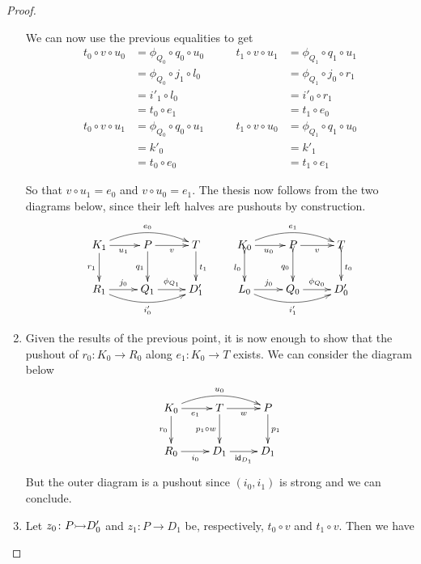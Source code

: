 \begin{proof}
\begin{enumerate}
		We can now use the previous equalities to get
		\[\begin{split}
			t_0\circ v\circ u_0&=\phi_{Q_0} \circ q_0\circ u_0\\&=\phi_{Q_0}\circ j_1\circ l_0\\&=i'_1\circ l_0\\&=t_0\circ e_1\\	t_0\circ v\circ u_1&=\phi_{Q_0} \circ q_0\circ u_1\\&=k'_0\\&= t_0\circ e_0
		\end{split} \qquad \begin{split}
			t_1\circ v\circ u_1&=\phi_{Q_1} \circ q_1\circ u_1\\&=\phi_{Q_1}\circ j_0\circ r_1\\&=i'_0\circ r_1\\&= t_1\circ e_0 \\ t_1\circ v\circ u_0&=\phi_{Q_1} \circ q_1\circ u_0\\&=k'_1\\&=t_1\circ e_1
		\end{split}\]
		
	So that $v\circ u_1=e_0$ and $v\circ u_0=e_1$. The thesis now follows from the two diagrams below, since their left halves are pushouts by construction.		
		\[\xymatrix{K_1  \ar@/^.4cm/[rr]^{e_0}\ar[r]_{u_1} \ar[d]_{r_1}& P \ar[r]_{v} \ar[d]_{q_1} & T \ar[d]^{t_1} & K_0 \ar@/^.4cm/[rr]^{e_1} \ar@{>->}[d]_{l_0}\ar[r]_{u_0} & P \ar[r]_{v}  \ar@{>->}[d]_{q_0}& T \ar@{>->}[d]^{t_0}\\ R_1 \ar@/_.4cm/[rr]_{i'_0} \ar[r]^{j_0}& Q_1 \ar[r]^{\phi_{Q_1}} & D'_1 & L_0 \ar@/_.4cm/[rr]_{i'_1} \ar[r]^{j_0} & Q_0 \ar[r]^{\phi_{Q_0}} & D'_0 }\]
		
	
		\item Given the results of the previous point, it is now enough to show that the pushout of $r_0\colon K_0\to R_0$ along $e_1\colon K_0\to T$ exists. We can consider the diagram below
		\[\xymatrix{K_0 \ar@/^.4cm/[rr]^{u_0} \ar[d]_{r_0} \ar[r]_{e_1}& T  \ar[d]_{p_1\circ w}\ar[r]_{w} & P \ar[d]^{p_1}\\ R_0 \ar[r]_{i_0}& D_1 \ar[r]_{\id{D_1}}& D_1}\]
		But the outer diagram is a pushout since $(i_0, i_1)$ is strong and we can conclude. 
		
		
		
		\item Let $z_0\colon P\mto D'_0$ and $z_1\colon P\to D_1$ be, respectively, $t_0\circ v$ and $t_1\circ v$. Then we have
		

\end{enumerate}
\end{proof}
